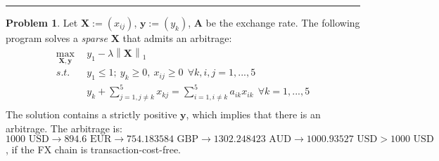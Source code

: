 \documentclass[a4paper, 8pt]{article}
\theoremstyle{definition}
\newtheorem{problem}{Problem}
\theoremstyle{hSol}
\begin{document}
\noindent\rule{16cm}{0.4pt}
\begin{problem} Let $\bm{X}:=(x_{ij})$, $\bm{y}:=(y_k)$, $\bm{A}$ be the exchange rate. The following program solves a \textit{sparse} $\bm{X}$ that admits an arbitrage:
\begin{equation}
	\begin{split}
		\underset{\bm{X,y}}{\text{max}} ~~ &y_1 - \lambda \left\lVert \bm{X}\right\rVert_1 \\
		s.t.~~ & y_1 \leq 1;~y_k \geq 0,~x_{ij}\geq 0~~\forall k,i,j = 1,...,5 \\
		& y_k + \sum_{j=1,j\ne k}^5 x_{kj} = \sum_{i=1,i\ne k}^5 a_{ik}x_{ik}~~\forall k = 1,...,5 \\
	\end{split}
\end{equation}
The solution contains a strictly positive $\bm{y}$, which implies that there is an arbitrage. The arbitrage is: $1000\text{ USD}\to 894.6\text{ EUR}\to 754.183584 \text{ GBP} \to 1302.248423 \text{ AUD}\to 1000.93527\text{ USD} > 1000\text{ USD}$, if the FX chain is transaction-cost-free.

\end{problem}
\end{document}
